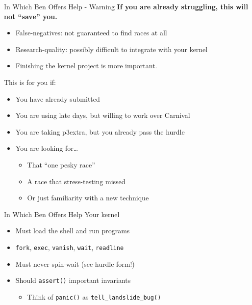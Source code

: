 \documentclass[xcolor=dvipsnames]{beamer}
\begin{document}
{\begin{frame}{In Which Ben Offers Help - Warning}
	\textbf{If you are already struggling, this will not ``save'' you.}
	\begin{itemize}
		\item False-negatives: not guaranteed to find races at all
		\item Research-quality: possibly difficult to integrate with your kernel
		\item Finishing the kernel project is more important.
	\end{itemize}
	\pause
	\linegap
	This is for you if:
	\begin{itemize}
		\item You have already submitted
		\item You are using late days, but willing to work over Carnival
		\item You are taking p3extra, but you already pass the hurdle
		\item You are looking for\ldots
			\begin{itemize}
				\item That ``one pesky race''
				\item A race that stress-testing missed
				\item Or just familiarity with a new technique
			\end{itemize}
	\end{itemize}
\end{frame}

\begin{frame}{In Which Ben Offers Help}
	Your kernel
	\begin{itemize}
		\item Must load the shell and run programs
		\item \texttt{fork},
			\texttt{exec},
			\texttt{vanish},
			\texttt{wait},
			\texttt{readline}
		\item Must never spin-wait (see hurdle form!)
		\item Should \texttt{assert()} important invariants
		\begin{itemize}
			\item Think of \texttt{panic()} as \texttt{tell\_landslide\_bug()}
		\end{itemize}
	\end{itemize}
\end{frame}

}
\end{document}
